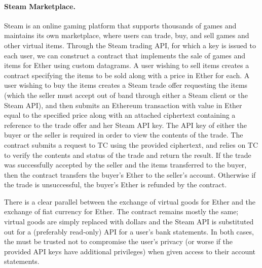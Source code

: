 \paragraph{Steam Marketplace.} Steam  is an online gaming platform that supports thousands of games and maintains its own marketplace, where users can trade, buy, and sell games and other virtual items.  Through the Steam trading API, for which a key is issued to each user, we can construct a contract that implements the sale of games and items for Ether using custom datagrams.  A user wishing to sell items creates a contract specifying the items to be sold along with a price in Ether for each.  A user wishing to buy the items creates a Steam trade offer requesting the items (which the seller must accept out of band through either a Steam client or the Steam API), and then submits an Ethereum transaction with value in Ether equal to the specified price along with an attached ciphertext containing a reference to the trade offer and her Steam API key.  The API key of either the buyer or the seller is required in order to view the contents of the trade.  The contract submits a request to TC using the provided ciphertext, and relies on TC to verify the contents and status of the trade and return the result.  If the trade was successfully accepted by the seller and the items transferred to the buyer, then the contract transfers the buyer's Ether to the seller's account.  Otherwise if the trade is unsuccessful, the buyer's Ether is refunded by the contract.

There is a clear parallel between the exchange of virtual goods for Ether and the exchange of fiat currency for Ether.  The contract remains mostly the same; virtual goods are simply replaced with dollars and the Steam API is substituted out for a (preferably read-only) API for a user's bank statements.  In both cases, the \encname must be trusted not to compromise the user's privacy (or worse if the provided API keys have additional privileges) when given access to their account statements.
\fi


